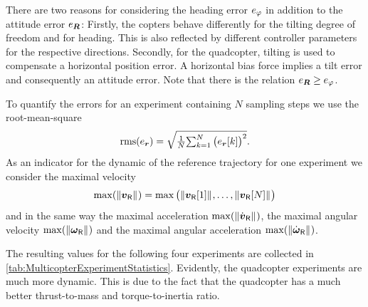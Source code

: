 There are two reasons for considering the heading error $e_{\varphi}$ in addition to the attitude error $e_{\boldsymbol{R}}$:
Firstly, the copters behave differently for the tilting degree of freedom and for heading.
This is also reflected by different controller parameters for the respective directions.
Secondly, for the quadcopter, tilting is used to compensate a horizontal position error.
A horizontal bias force implies a tilt error and consequently an attitude error.
Note that there is the relation $e_{\boldsymbol{R}} \geq e_{\varphi}$.

To quantify the errors for an experiment containing $N$ sampling steps we use the root-mean-square
\begin{align}
 \operatorname{rms}(e_{\boldsymbol{r}}) = \sqrt{ \tfrac{1}{N} \textstyle{\sum_{k=1}^{N} \big( e_{\boldsymbol{r}}[k] \big)^2} }.
\end{align}
As an indicator for the dynamic of the reference trajectory for one experiment we consider the maximal velocity
\begin{align}
 \max(\| \boldsymbol{v}_{\mathsf{R}} \|_{}) = \max\big( \| \boldsymbol{v}_{\mathsf{R}}[1] \|_{}, \ldots, \| \boldsymbol{v}_{\mathsf{R}}[N] \|_{} \big)
\end{align}
and in the same way the maximal acceleration $\max(\| \dot{\boldsymbol{v}}_{\mathsf{R}} \|_{})$, the maximal angular velocity $\max(\| \boldsymbol{\omega}_{\mathsf{R}} \|_{})$ and the maximal angular acceleration $\max(\| \dot{\boldsymbol{\omega}}_{\mathsf{R}} \|_{})$.

The resulting values for the following four experiments are collected in \autoref{tab:MulticopterExperimentStatistics}.
Evidently, the quadcopter experiments are much more dynamic.
This is due to the fact that the quadcopter has a much better thrust-to-mass and torque-to-inertia ratio.

